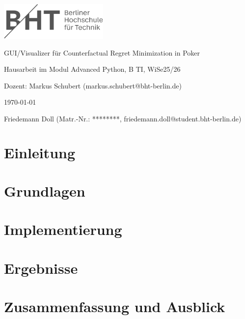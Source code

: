 \documentclass[12pt,german,english]{article}
\begin{document}
\begin{center}

    \includegraphics[width=0.4\textwidth]{../Motivationsschreiben/bht-logo.png}

    \vspace{1.5cm}

    {\huge GUI/Visualizer für Counterfactual Regret Minimization in Poker}

    \vspace*{1cm}

    Hausarbeit im Modul Advanced Python, B TI, WiSe25/26

    \vspace{0.5cm}

    Dozent: Markus Schubert (markus.schubert@bht-berlin.de)

    \vspace{0.5cm}

    \todayfmtde\today

    \vspace{1cm}

    Friedemann Doll (Matr.-Nr.: ********, friedemann.doll@student.bht-berlin.de)

\end{center}

\vspace*{1cm}

\section{Einleitung}

\section{Grundlagen}

\section{Implementierung}

\section{Ergebnisse}

\section{Zusammenfassung und Ausblick}
\end{document}
